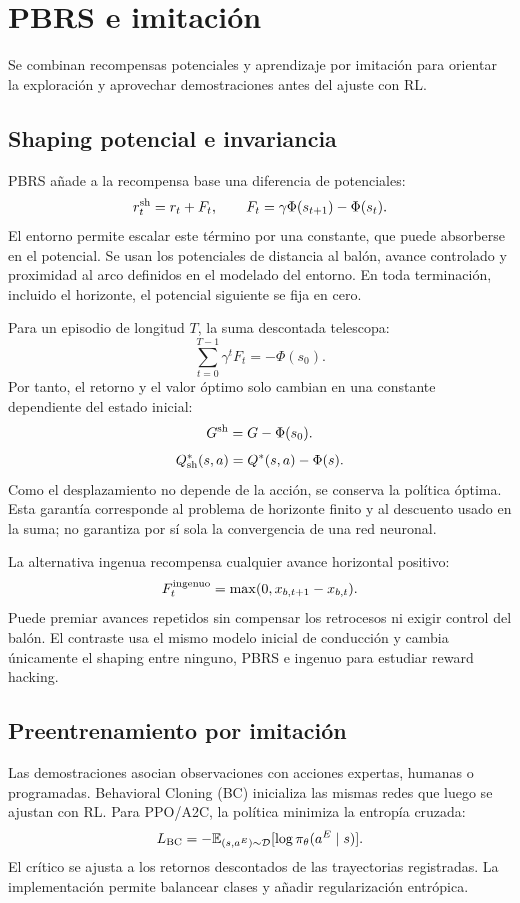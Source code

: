 \section{PBRS e imitación}
Se combinan recompensas potenciales y aprendizaje por imitación para orientar
la exploración y aprovechar demostraciones antes del ajuste con RL.

\subsection{Shaping potencial e invariancia}
PBRS \cite{ng1999} añade a la recompensa base una diferencia de potenciales:
\[
    r_t^{\rm sh}=r_t+F_t,\qquad F_t=\gamma\Phi(s_{t+1})-\Phi(s_t).
\]
El entorno permite escalar este término por una constante, que puede absorberse
en el potencial. Se usan los potenciales de distancia al balón, avance controlado
y proximidad al arco definidos en el modelado del entorno. En toda terminación,
incluido el horizonte, el potencial siguiente se fija en cero.

Para un episodio de longitud $T$, la suma descontada telescopa:
\begin{equation}
    \sum_{t=0}^{T-1}\gamma^t F_t=-\Phi(s_0).
\end{equation}
Por tanto, el retorno y el valor óptimo solo cambian en una constante dependiente
del estado inicial:
\[
    G^{\rm sh}=G-\Phi(s_0).
\]
\[
    Q_{\rm sh}^*(s,a)=Q^*(s,a)-\Phi(s).
\]
Como el desplazamiento no depende de la acción, se conserva la política óptima.
Esta garantía corresponde al problema de horizonte finito y al descuento usado
en la suma; no garantiza por sí sola la convergencia de una red neuronal.

La alternativa ingenua recompensa cualquier avance horizontal positivo:
\[
    F_t^{\rm ingenuo}=\max(0,x_{b,t+1}-x_{b,t}).
\]
Puede premiar avances repetidos sin compensar los retrocesos ni exigir control
del balón. El contraste usa el mismo modelo inicial de conducción y cambia
únicamente el shaping entre ninguno, PBRS e ingenuo para estudiar reward hacking.

\subsection{Preentrenamiento por imitación}
Las demostraciones asocian observaciones con acciones expertas, humanas o
programadas. Behavioral Cloning (BC) inicializa las mismas redes que luego se
ajustan con RL. Para PPO/A2C, la política minimiza la entropía cruzada:
\[
    L_{\rm BC}=-\mathbb{E}_{(s,a^E)\sim\mathcal{D}}[\log\pi_\theta(a^E\mid s)].
\]
El crítico se ajusta a los retornos descontados de las trayectorias registradas.
La implementación permite balancear clases y añadir regularización entrópica.

